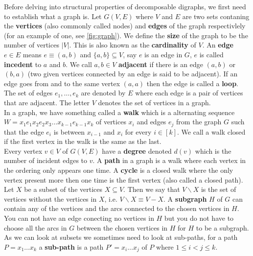 Before delving into structural properties of decomposable digraphs, we first need to establish what a graph is.
Let $G(V,E)$ where $V$ and $E$ are two sets contaning the \textbf{vertices} (also commonly called nodes) and \textbf{edges} of the graph respectivlely (for an example of one, see \autoref{fig:graph}). 
We define the \textbf{size} of the graph to be the number of vertices $|V|$. 
This is also known as the \textbf{cardinality} of $V$.
An \textbf{edge} $e \in E$ means $e \equiv (a, b)$ and $\{ a, b \} \subseteq V$, say $e$ is an edge in $G$, $e$ is called \textbf{incedent} to $a$ and $b$. 
We call $a,b \in V$ \textbf{adjacent} if there is an edge $(a,b)$ or $(b,a)$ (two given vertices connected by an edge is said to be adjacent).
If an edge goes from and to the same vertex $(a,a)$ then the edge is called a \textbf{loop}.
The set of edges $e_1, \dots, e_k$ are denoted by $E$ where each edge is a pair of vertices that are adjacent. 
The letter $V$ denotes the set of vertices in a graph. \\
In a graph, we have something called a \textbf{walk} which is a alternating sequence\\ $W=x_1e_1x_2e_2x_3\dots x_{k-1}e_{k-1}x_k$ of vertices $x_i$ and edges $e_j$ from the graph $G$ such that the edge $e_i$ is between $x_{i-1}$ and $x_i$ for every $i\in [k]$. 
We call a walk closed if the first vertex in the walk is the same as the last.\\
Every vertex $v\in V$ of $G(V,E)$ have a \textbf{degree} denoted $d(v)$ which is the number of incident edges to $v$.
A \textbf{path} in a graph is a walk where each vertex in the ordering only appears one time. 
A \textbf{cycle} is a closed walk where the only vertex present more then one time is the first vertex (also called a closed path). 
Let $X$ be a subset of the vertices $X\subseteq V$. 
Then we say that $V\backslash X$ is the set of vertices without the vertices in $X$, i.e. $V\backslash X \equiv V-X$. 
A \textbf{subgraph} $H$ of $G$ can contain any of the vertices and the arcs connected to the chosen vertices in $H$. 
You can not have an edge conecting no vertices in $H$ but you do not have to choose all the arcs in $G$ between the chosen vertices in $H$ for $H$ to be a subgraph. \\
As we can look at subsets we sometimes need to look at sub-paths, for a path $P=x_1\dots x_k$ a \textbf{sub-path} is a path $P'=x_i\dots x_j$ of $P$ where $1\leq i < j \leq k$.
